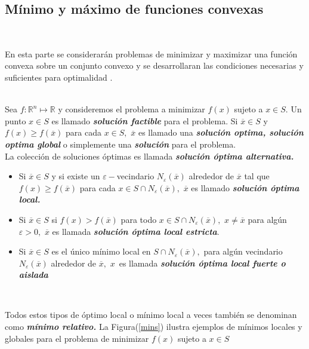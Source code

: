 \subsection{Mínimo y máximo de funciones convexas}
~\medskip

En esta parte se considerarán problemas de minimizar y maximizar una función convexa sobre un conjunto convexo y se desarrollaran las 
condiciones necesarias y suficientes para optimalidad \cite{no-lineal}.\\ 
\medskip
\

{ Sea $f: \mathbb{R}^n \longmapsto \mathbb{R}$ y consideremos el problema a minimizar $f(x)$ sujeto a $x \in S.$ Un punto $x \in S$ 
es llamado \textbf{\itshape solución factible} para el problema. Si $\overline{x} \in S $ y $ f(x) \geqslant f(\overline{x})$ para cada $x \in 
S,\,\, \overline{x} $ es llamado una \textbf{\itshape solución optima, solución optima global} o simplemente una \textbf{\itshape solución}
para el problema. \label{sol-problem}  }\\

La colección de soluciones óptimas es llamada \textbf{\itshape solución óptima alternativa.} 
\begin{itemize}
   \item Si $\overline{x} \in S$ y si existe un $\varepsilon-$vecindario $N_{\varepsilon}(\overline{x})$ alrededor de $\overline{x}$ tal que $ f(x) \geqslant f(\overline{x})$ para
	 cada $x \in S \cap N_{\varepsilon}(\overline{x}), \,\, \overline{x} $ es llamado \textbf{\itshape solución óptima local.}
   \item Si $\overline{x} \in S$ si $ f(x) > f(\overline{x})$ para todo $ x \in S \cap N_{\varepsilon}(\overline{x}), \,\,
	 x \neq \overline{x}$ para algún $\varepsilon > 0,\,\, \overline{x} $ es llamada \textbf{\itshape solución óptima local estricta}.
   \item Si $\overline{x} \in S$ es el único mínimo local en $ S \cap N_{\varepsilon}(\overline{x}), $ para algún vecindario
	 $N_{\varepsilon}(\overline{x})$ alrededor de $\overline{x}, \,\, x\,$ es llamada \textbf{\itshape solución óptima local fuerte o 
	 aislada}
\end{itemize}
~\medskip

Todos estos tipos de \'optimo local o m\'inimo local a veces tambi\'en se denominan como \textbf{\itshape m\'inimo relativo.} La 
Figura(\ref{mins}) ilustra ejemplos de m\'inimos locales y globales para el problema de minimizar $f(x)$ sujeto a $x \in S$

